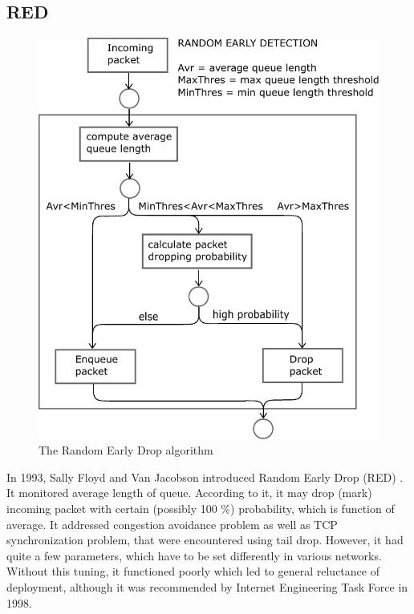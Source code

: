 \subsection{RED}


\begin{figure}
	\centering
	\includegraphics[width=137mm]{drawings/RED}
	\caption{The Random Early Drop algorithm}
	
	\label{fig04:RED}
\end{figure}

In 1993, Sally Floyd and Van Jacobson introduced Random Early Drop (RED) \cite{Floyd:1993:RED:169931.169935}. It monitored average length of queue. According to it, it may drop (mark) incoming packet with certain (possibly 100 \%) probability, which is function of average. It addressed congestion avoidance problem as well as TCP synchronization problem, that were encountered using tail drop. However, it had quite a few parameters, which have to be set differently in various networks. Without this tuning, it functioned poorly which led to general reluctance of deployment, although it was recommended by Internet Engineering Task Force \cite{rfc2309} in 1998.

